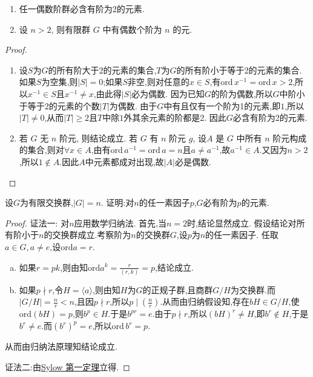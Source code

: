 \documentclass[../../main.tex]{subfiles}%
\begin{document}
\begin{example}
\begin{enumerate}[(1)]
\item 任一偶数阶群必含有阶为2的元素.

\item 设 $n > 2$, 则有限群 $G$ 中有偶数个阶为 $n$ 的元.
\end{enumerate}

\end{example}
\begin{proof}
\begin{enumerate}[(1)]
\item 设$S$为$G$的所有阶大于2的元素的集合,$T$为$G$的所有阶小于等于2的元素的集合. 如果$S$为空集,则$|S| = 0$;如果$S$非空,则对任意的$x \in S$,有$\text{ord}\,x^{-1} = \text{ord}\,x > 2$,所以$x^{-1} \in S$且$x^{-1} \neq x$,由此得$|S|$必为偶数. 因为已知$G$的阶为偶数,所以$G$中阶小于等于2的元素的个数$|T|$为偶数. 由于$G$中有且仅有一个阶为1的元素,即$1$,所以$|T| \neq 0$,从而$|T| \geqslant 2$且$T$中除$1$外其余元素的阶都是2. 因此$G$必含有阶为2的元素.

\item 若 $G$ 无 $n$ 阶元, 则结论成立. 若 $G$ 有 $n$ 阶元 $g$, 设$A$ 是 $G$ 中所有 $n$ 阶元构成的集合,则对$\forall x\in A$,由有$\text{ord}\,a^{-1} = \text{ord}\,a = n$且$a\neq a^{-1}$,故$a^{-1}\in A$.又因为$n>2$,所以$1\notin A$.因此$A$中元素都成对出现,故$|A|$必是偶数.

\end{enumerate}
\end{proof}

\begin{example}
设$G$为有限交换群,$|G|=n$. 证明:对$n$的任一素因子$p$,$G$必有阶为$p$的元素.
\end{example}
\begin{proof}

{\color{blue}证法一:}
对$n$应用数学归纳法.
首先,当$n=2$时,结论显然成立.
假设结论对所有阶小于$n$的交换群成立.考察阶为$n$的交换群$G$,设$p$为$n$的任一素因子.
任取$a\in G,a\neq e$,设$\text{ord}a=r$.
\begin{enumerate}[(a)]
\item 如果$r=pk$,则由知$\text{ord}a^k=\frac{r}{(r,k)}=p$,结论成立.
\item 如果$p\nmid r$,令$H=\langle a\rangle$,则由知$H$为$G$的正规子群,且商群$G/H$为交换群.而$|G/H|=\frac{n}{r}<n$,且因$p\nmid r$,所以$p\mid\left(\frac{n}{r}\right)$.从而由归纳假设知,存在$bH\in G/H$,使$\text{ord}(bH)=p$,则$b^p\in H$.于是$b^{pr}=e$.由于$p\nmid r$,所以$(bH)^r\neq H$,即$b^r\notin H$,于是$b^r\neq e$.而$(b^r)^p=e$,所以$\text{ord}\,b^r=p$.
\end{enumerate}
从而由归纳法原理知结论成立.

{\color{blue}证法二:}由\hyperref[theorem:Sylow 第一定理]{Sylow 第一定理}立得.
\end{proof}
\end{document}
